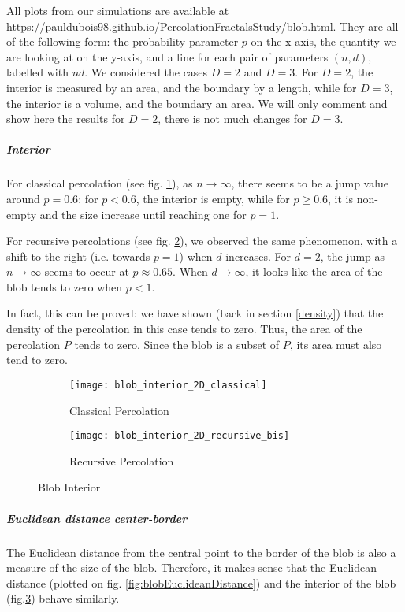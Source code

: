 All plots from our simulations are available at \url{https://pauldubois98.github.io/PercolationFractalsStudy/blob.html}.
They are all of the following form: the probability parameter $p$ on the x-axis, the quantity we are looking at on the y-axis, and a line for each pair of parameters $(n,d)$, labelled with $n \hat{} d$.
We considered the cases $D=2$ and $D=3$.
For $D=2$, the interior is measured by an area, and the boundary by a length, while for $D=3$, the interior is a volume, and the boundary an area.
We will only comment and show here the results for $D=2$, there is not much changes for $D=3$.

\subparagraph{Interior}
For classical percolation (see fig. \ref{fig:blobInteriorClassical}), as $n \to \infty$, there seems to be a jump value around $p=0.6$: for $p<0.6$, the interior is empty, while for $p \geq 0.6$, it is non-empty and the size increase until reaching one for $p=1$.

For recursive percolations (see fig. \ref{fig:blobInteriorRecursive}), we observed the same phenomenon, with a shift to the right (i.e. towards $p=1$) when $d$ increases.
For $d=2$, the jump as $n \to \infty$ seems to occur at $p \approx 0.65$.
When $d \to \infty$, it looks like the area of the blob tends to zero when $p<1$.

In fact, this can be proved: we have shown (back in section \ref{density}) that the density of the percolation in this case tends to zero.
Thus, the area of the percolation $P$ tends to zero.
Since the blob is a subset of $P$, its area must also tend to zero.

\begin{figure}[!h]
	\centering
	\begin{subfigure}{.49\textwidth}
		\texttt{[image: blob\_interior\_2D\_classical]}
		\centering
		\caption{Classical Percolation}
		\label{fig:blobInteriorClassical}
	\end{subfigure}
	\begin{subfigure}{.49\textwidth}
		\texttt{[image: blob\_interior\_2D\_recursive\_bis]}
		\centering
		\caption{Recursive Percolation}
		\label{fig:blobInteriorRecursive}
	\end{subfigure}
	\caption{Blob Interior}
	\label{fig:blobInterior}
\end{figure}


\subparagraph{Euclidean distance center-border}
The Euclidean distance from the central point to the border of the blob is also a measure of the size of the blob.
Therefore, it makes sense that the Euclidean distance (plotted on fig. \ref{fig:blobEuclideanDistance}) and the interior of the blob (fig.\ref{fig:blobInterior}) behave similarly.

